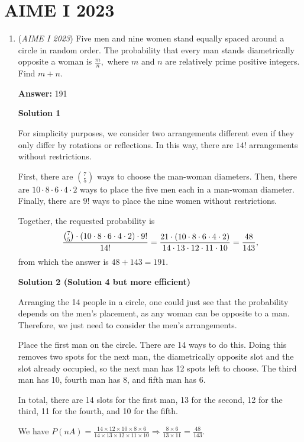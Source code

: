 \section{AIME I 2023}
        \begin{enumerate}
        	\item (\textit{AIME I 2023}) Five men and nine women stand equally spaced around a circle in random order. The probability that every man stands diametrically opposite a woman is $\frac{m}{n},$ where $m$ and $n$ are relatively prime positive integers. Find $m+n.$

 \textbf{Answer: }191



\textbf{Solution 1}

For simplicity purposes, we consider two arrangements different even if they only differ by rotations or reflections. In this way, there are $14!$ arrangements without restrictions.

 First, there are $\binom{7}{5}$ ways to choose the man-woman diameters. Then, there are $10\cdot8\cdot6\cdot4\cdot2$ ways to place the five men each in a man-woman diameter. Finally, there are $9!$ ways to place the nine women without restrictions.

 Together, the requested probability is 
 \[\frac{\tbinom{7}{5}\cdot(10\cdot8\cdot6\cdot4\cdot2)\cdot9!}{14!} = \frac{21\cdot(10\cdot8\cdot6\cdot4\cdot2)}{14\cdot13\cdot12\cdot11\cdot10} = \frac{48}{143},\] from which the answer is $48+143 = \boxed{191}.$




\textbf{Solution 2 (Solution 4 but more efficient)}

Arranging the 14 people in a circle, one could just see that the probability depends on the men's placement, as any woman can be opposite to a man. Therefore, we just need to consider the men's arrangements.

 Place the first man on the circle. There are 14 ways to do this. Doing this removes two spots for the next man, the diametrically opposite slot and the slot already occupied, so the next man has 12 spots left to choose. The third man has 10, fourth man has 8, and fifth man has 6.

 In total, there are 14 slots for the first man, 13 for the second, 12 for the third, 11 for the fourth, and 10 for the fifth.

 We have \( P(nA) = \frac{14 \times 12 \times 10 \times 8 \times 6}{14 \times 13 \times 12 \times 11 \times 10} \Rightarrow \frac{8 \times 6}{13 \times 11} = \frac{48}{143} \).


\end{enumerate}
